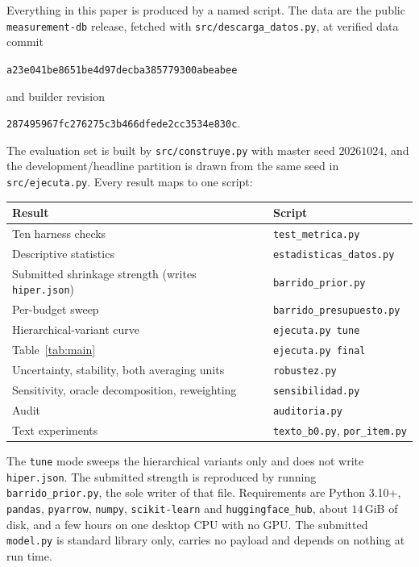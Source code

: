 \documentclass{article}
\begin{document}
Everything in this paper is produced by a named script. The data are the public
\texttt{measurement-db} release, fetched with \texttt{src/descarga\_datos.py}, at
verified data commit
\begin{center}\small\texttt{a23e041be8651be4d97decba385779300abeabee}\end{center}
and builder revision
\begin{center}\small\texttt{287495967fc276275c3b466dfede2cc3534e830c}.\end{center} The evaluation set is built by \texttt{src/construye.py} with master seed
$20261024$, and the development/headline partition is drawn from the same seed in
\texttt{src/ejecuta.py}. Every result maps to one script:

\begin{center}\small
\begin{tabular}{ll}
\toprule
Result & Script \\
\midrule
Ten harness checks                       & \texttt{test\_metrica.py} \\
Descriptive statistics                   & \texttt{estadisticas\_datos.py} \\
Submitted shrinkage strength (writes \texttt{hiper.json}) & \texttt{barrido\_prior.py} \\
Per-budget sweep                         & \texttt{barrido\_presupuesto.py} \\
Hierarchical-variant curve               & \texttt{ejecuta.py tune} \\
Table~\ref{tab:main}                     & \texttt{ejecuta.py final} \\
Uncertainty, stability, both averaging units & \texttt{robustez.py} \\
Sensitivity, oracle decomposition, reweighting & \texttt{sensibilidad.py} \\
Audit                                    & \texttt{auditoria.py} \\
Text experiments                         & \texttt{texto\_b0.py}, \texttt{por\_item.py} \\
\bottomrule
\end{tabular}
\end{center}

\noindent The \texttt{tune} mode sweeps the hierarchical variants only and does
not write \texttt{hiper.json}. The submitted strength is reproduced by running
\texttt{barrido\_prior.py}, the sole writer of that file.
Requirements are Python 3.10+, \texttt{pandas},
\texttt{pyarrow}, \texttt{numpy}, \texttt{scikit-learn} and
\texttt{huggingface\_hub}, about $14$\,GiB of disk, and a few hours on one
desktop CPU with no GPU. The submitted \texttt{model.py} is standard library
only, carries no payload and depends on nothing at run time.
\end{document}
